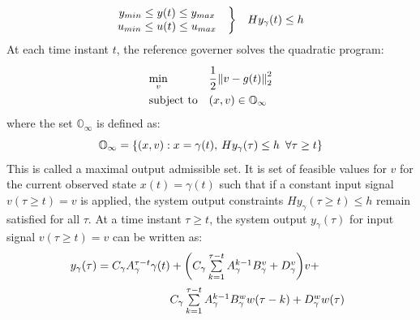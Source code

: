 \documentclass[letterpaper, 10 pt, conference]{ieeeconf}  %
\newcommand{\norm}[1]{\left\lVert#1\right\rVert}
\begin{document}
\begin{enumerate}
	\begin{equation*}
	\begin{matrix}
	\begin{matrix}
	y_{min} \leq y(t) \leq y_{max} \\
	u_{min} \leq u(t) \leq u_{max}
	\end{matrix} & \bigg{\}} & Hy_{\gamma}(t) \leq h
	\end{matrix}
	\end{equation*}
	At each time instant $t$, the reference governer solves the quadratic program:
	\begin{equation}
	\begin{aligned}
	& \underset{v}{\text{min}}
	& & \cfrac{1}{2}\norm{v-g(t)}_2^2 \\
	& \text{subject to}
	& & 
	(x,v) \in \mathbb{O}_{\infty}
	\end{aligned}
	\label{RGprob}
	\end{equation}
	where the set $\mathbb{O}_{\infty}$ is defined as:
	\begin{equation*}
	\mathbb{O}_{\infty} = \{(x,v): x = \gamma(t), \hspace{2pt} Hy_{\gamma}(\tau) \leq h \hspace{5pt} \forall \tau \geq t \} \\ 
	\end{equation*}
	This is called a maximal output admissible set.
	It is set of feasible values for $v$ for the current observed state $x(t)=\gamma(t)$ such that if a constant input signal $v(\tau \geq t)=v$ is applied, the system output constraints $Hy_{\gamma}(\tau \geq t) \leq h$ remain satisfied for all $\tau$.
	At a time instant $\tau \geq t$, the system output $y_{\gamma}(\tau)$ for input signal $v(\tau \geq t)=v$ can be written as:
	\begin{equation*}
	\hspace{-30pt}
	\begin{aligned}
	\begin{matrix}
	y_{\gamma}(\tau) = C_{\gamma}A_{\gamma}^{\tau - t}\gamma(t) + \bigg( C_{\gamma}\sum\limits_{k=1}^{\tau - t}A_{\gamma}^{k-1}B^v_{\gamma} + D_{\gamma}^v \bigg)v + \vspace{5pt}\\  \hspace{110pt} C_{\gamma}\sum\limits_{k=1}^{\tau - t}A_{\gamma}^{k-1}B^w_{\gamma}w(\tau-k) + D_{\gamma}^w w(\tau)
	\end{matrix}
	\end{aligned}
	\end{equation*} \\

\end{enumerate}
\end{document}
